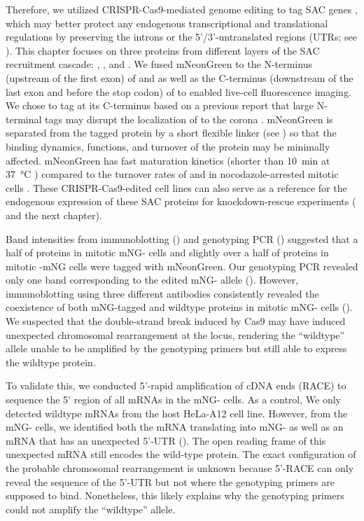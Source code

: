 Therefore, we utilized CRISPR-Cas9-mediated genome editing to tag SAC genes  \cite{CRISPRProtocol, Atlas}, which may better protect any endogenous transcriptional and translational regulations by preserving the introns or the 5'/3'-untranslated regions (UTRs; see ). This chapter focuses on three proteins from different layers of the SAC recruitment cascade: , , and . We fused mNeonGreen to the N-terminus (upstream of the first exon) of  and  as well as the C-terminus (downstream of the last exon and before the stop codon) of  to enabled live-cell fluorescence imaging. We chose to tag  at its C-terminus based on a previous report that large N-terminal tags may disrupt the localization of  to the corona \cite{CoronaActivatesSAC}. mNeonGreen is separated from the tagged protein by a short flexible linker (see ) so that the binding dynamics, functions, and turnover of the protein may be minimally affected. mNeonGreen has fast maturation kinetics (shorter than \SI{10}{min} at \SI{37}{\celsius} \cite{mNG}) compared to the turnover rates of  and  in nocodazole-arrested mitotic cells \cite{BubR1MitosisTurnover, Bub1MitosisTurnover}. These CRISPR-Cas9-edited cell lines can also serve as a reference for the endogenous expression of these SAC proteins for knockdown-rescue experiments ( and the next chapter).

Band intensities from immunoblotting () and genotyping PCR () suggested that a half of  proteins in mitotic mNG- cells and slightly over a half of  proteins in mitotic -mNG cells were tagged with mNeonGreen. Our genotyping PCR revealed only one band corresponding to the edited mNG- allele (). However, immunoblotting using three different antibodies consistently revealed the coexistence of both mNG-tagged and wildtype  proteins in mitotic mNG- cells (). We suspected that the double-strand break induced by Cas9 may have induced unexpected chromosomal rearrangement at the  locus, rendering the ``wildtype'' allele unable to be amplified by the genotyping primers but still able to express the wildtype  protein.

To validate this, we conducted 5'-rapid amplification of cDNA ends (RACE) to sequence the 5' region of all  mRNAs in the mNG- cells. As a control, We only detected wildtype  mRNAs from the host HeLa-A12 cell line. However, from the mNG- cells, we identified both the mRNA translating into mNG- as well as an mRNA that has an unexpected 5'-UTR (). The open reading frame of this unexpected mRNA still encodes the wild-type  protein. The exact configuration of the probable chromosomal rearrangement is unknown because 5'-RACE can only reveal the sequence of the 5'-UTR but not where the genotyping primers are supposed to bind. Nonetheless, this likely explains why the genotyping primers could not amplify the ``wildtype'' allele.

